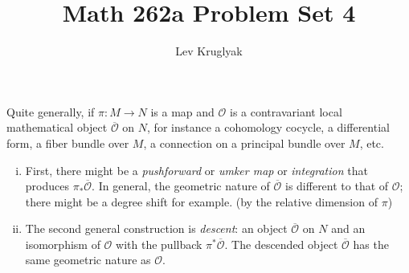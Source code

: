 \documentclass{pset}
\title{Math 262a Problem Set 4}
\author{Lev Kruglyak}
\begin{document}
\maketitle

\begin{problem}{1}
  Quite generally, if $\pi : M \to N$ is a map and $\mathcal{O}$ is a contravariant local mathematical object $\overline{\mathcal{O}}$ on $N$, for instance a cohomology cocycle, a differential form, a fiber bundle over $M$, a connection on a principal bundle over $M$, etc.
  \begin{enumerate}[(i)]
    \item First, there might be a \emph{pushforward} or \emph{umker map} or \emph{integration} that produces $\pi_*\overline{\mathcal{O}}$. In general, the geometric nature of $\overline{\mathcal{O}}$ is different to that of $\mathcal{O}$; there might be a degree shift for example. (by the relative dimension of $\pi$)

    \item The second general construction is \emph{descent}: an object $\overline{\mathcal{O}}$ on $N$ and an isomorphism of $\mathcal{O}$ with the pullback $\pi^*\overline{\mathcal{O}}$. The descended object $\overline{\mathcal{O}}$ has the same geometric nature as $\mathcal{O}$.
  \end{enumerate}
\end{problem}
\end{document}
